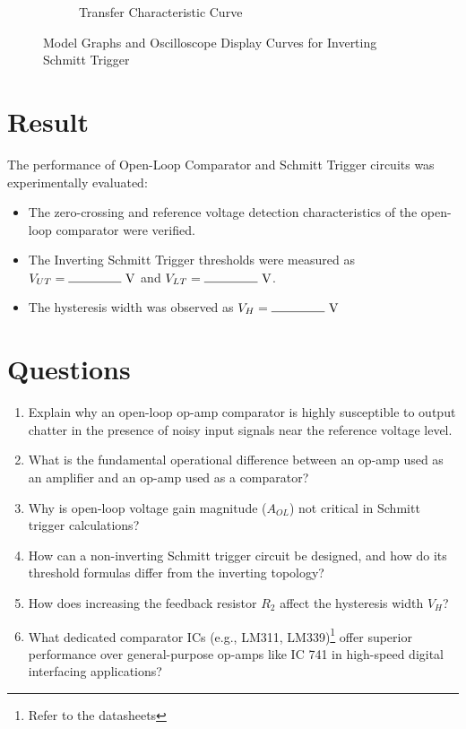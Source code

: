 \begin{figure}[h!]
\begin{subfigure}[b]{0.38\textwidth}
\caption{Transfer Characteristic Curve}
\end{subfigure}
\caption{Model Graphs and Oscilloscope Display Curves for Inverting Schmitt Trigger}
\label{fig:expected_comparator_graphs}
\end{figure}

\section{Result}
The performance of Open-Loop Comparator and Schmitt Trigger circuits was experimentally evaluated:
\begin{itemize}
\item The zero-crossing and reference voltage detection characteristics of the open-loop comparator were verified.
\item The Inverting Schmitt Trigger thresholds were measured as $V_{UT} = \rule{1.5cm}{0.15mm}\text{ V}$ and $V_{LT} = \rule{1.5cm}{0.15mm}\text{ V}$. %
\item The hysteresis width was observed as $V_H = \rule{1.5cm}{0.15mm}\text{ V}$ %
\end{itemize}

\section{Questions}
\begin{enumerate}
\item Explain why an open-loop op-amp comparator is highly susceptible to output chatter in the presence of noisy input signals near the reference voltage level.
\item What is the fundamental operational difference between an op-amp used as an amplifier and an op-amp used as a comparator?
\item Why is open-loop voltage gain magnitude ($A_{OL}$) not critical in Schmitt trigger calculations?
\item How can a non-inverting Schmitt trigger circuit be designed, and how do its threshold formulas differ from the inverting topology?
\item How does increasing the feedback resistor $R_2$ affect the hysteresis width $V_H$?
\item What dedicated comparator ICs (e.g., LM311, LM339)\footnote{Refer to the datasheets} offer superior performance over general-purpose op-amps like IC 741 in high-speed digital interfacing applications?
\end{enumerate}